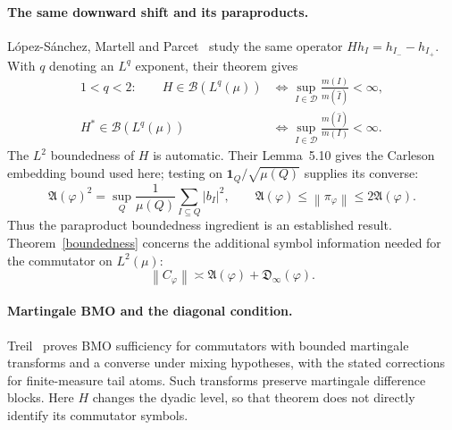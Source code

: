 \documentclass[11pt]{amsart}
\newcommand{\D}{\mathcal D}
\newcommand{\norm}[1]{\left\|#1\right\|}
\begin{document}
\paragraph{The same downward shift and its paraproducts.}
L\'opez-S\'anchez, Martell and Parcet~\cite[Theorem 2.5]{LMP2014}
study the same operator $Hh_I=h_{I_-}-h_{I_+}$. With $q$ denoting an
$L^q$ exponent, their theorem gives
\[
 \begin{aligned}
 1<q<2:\qquad
 H\in\mathcal B(L^q(\mu))
  &\Longleftrightarrow
       \sup_{I\in\D}\frac{m(I)}{m(\widehat I)}<\infty,\\
 H^*\in\mathcal B(L^q(\mu))
  &\Longleftrightarrow
       \sup_{I\in\D}\frac{m(\widehat I)}{m(I)}<\infty.
 \end{aligned}
\]
The $L^2$ boundedness of $H$ is automatic. Their
Lemma~5.10 gives the Carleson embedding bound used here; testing
on $\mathbf1_Q/\sqrt{\mu(Q)}$ supplies its converse:
\[
 \mathfrak A(\varphi)^2
    =\sup_Q\frac1{\mu(Q)}\sum_{I\subseteq Q}|b_I|^2,\qquad
 \mathfrak A(\varphi)\le\norm{\pi_\varphi}
                         \le2\mathfrak A(\varphi).
\]
Thus the paraproduct boundedness ingredient is an established result.
Theorem~\ref{boundedness} concerns the additional symbol information
needed for the commutator on $L^2(\mu)$:
\[
 \norm{C_\varphi}\asymp
          \mathfrak A(\varphi)+\mathfrak D_\infty(\varphi).
\]

\paragraph{Martingale BMO and the diagonal condition.}
Treil~\cite[Proposition 5.1 and Theorem 5.3]{Treil2013} proves BMO
sufficiency for commutators with bounded martingale transforms and
a converse under mixing hypotheses, with the stated corrections
for finite-measure tail atoms. Such transforms preserve martingale
difference blocks. Here $H$ changes the dyadic level, so that theorem
does not directly identify its commutator symbols.
\end{document}
